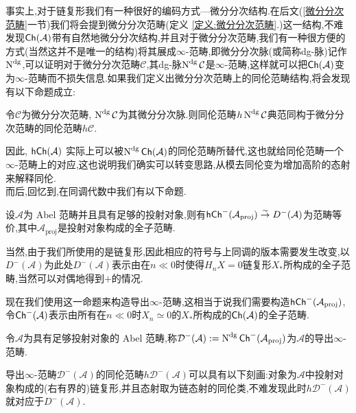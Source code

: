 事实上,对于链复形我们有一种很好的编码方式---微分分次结构.在后文(\ref{微分分次范畴}一节)我们将会提到微分分次范畴(定义 \ref{定义:微分分次范畴}.)这一结构,不难发现$\mathsf{Ch}(\mathcal{A})$带有自然地微分分次结构,并且对于微分分次范畴,我们有一种很方便的方式(当然这并不是唯一的结构)将其展成$\infty$-范畴,即微分分次脉(或简称dg-脉)记作$\operatorname{N}^{\operatorname{dg}}$,可以证明对于微分分次范畴$\mathcal{C}$,其dg-脉$\operatorname{N}^{\operatorname{dg}}\mathcal{C}$是$\infty$-范畴,这样就可以把$\mathsf{Ch}(\mathcal{A})$变为$\infty$-范畴而不损失信息.如果我们定义出微分分次范畴上的同伦范畴结构,将会发现有以下命题成立:
\begin{proposition*}
    令$\mathcal{C}$为微分分次范畴, $\operatorname{N}^{\operatorname{dg}}\mathcal{C}$为其微分分次脉.则同伦范畴$h\operatorname{N}^{\operatorname{dg}}\mathcal{C}$典范同构于微分分次范畴的同伦范畴$h\mathcal{C}$.
\end{proposition*}
因此, $\mathsf{hCh}(\mathcal{A})$ 实际上可以被$\operatorname{N}^{\operatorname{dg}}\mathsf{Ch}(\mathcal{A})$的同伦范畴所替代,这也就给同伦范畴一个$\infty$-范畴上的对应,这也说明我们确实可以转变思路,从模去同伦变为增加高阶的态射来解释同伦.\\
而后,回忆到,在同调代数中我们有以下命题.
\begin{proposition*}
    设$\mathcal{A}$为 Abel 范畴并且具有足够的投射对象,则有$\mathsf{hCh}^-(\mathcal{A}_{\operatorname{proj}})\stackrel{\sim}{\rightarrow} D^-(\mathcal{A})$为范畴等价,其中$\mathcal{A}_{\operatorname{proj}}$是投射对象构成的全子范畴.
\end{proposition*}
\begin{remark*}
    当然,由于我们所使用的是链复形,因此相应的符号与上同调的版本需要发生改变,以$D^{-}(\mathcal{A})$为此处$D^-(\mathcal{A})$表示由在$n \ll 0$时使得$H_nX = 0$链复形$X_*$所构成的全子范畴,当然可以对偶地得到$+$的情况.
\end{remark*}
现在我们使用这一命题来构造导出$\infty$-范畴,这相当于说我们需要构造$\mathsf{hCh}^-(\mathcal{A}_{\operatorname{proj}})$,令$\mathsf{Ch}^-(\mathcal{A})$表示由所有在$n \ll 0$时$X_n \simeq 0$的$X_*$所构成的$\mathsf{Ch}(\mathcal{A})$的全子范畴.
\begin{definition*}[导出$\infty$-范畴]
    令$\mathcal{A}$为具有足够投射对象的 Abel 范畴,称$\mathcal{D}^-(\mathcal{A}) := \operatorname{N}^{\operatorname{dg}}\mathsf{Ch}^-(\mathcal{A}_{\operatorname{proj}})$为$\mathcal{A}$的导出$\infty$-范畴.
\end{definition*}
\begin{remark*}
    导出$\infty$-范畴$\mathcal{D}^-(\mathcal{A})$的同伦范畴$h\mathcal{D}^-(\mathcal{A})$可以具有以下刻画:对象为$\mathcal{A}$中投射对象构成的(右有界的)链复形,并且态射取为链态射的同伦类,不难发现此时$h\mathcal{D}^-(\mathcal{A})$就对应于$D^-(\mathcal{A})$.
\end{remark*}
